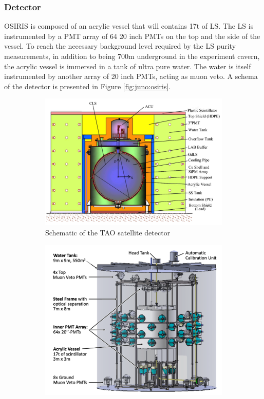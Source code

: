 \documentclass[../main.tex]{subfiles}
\begin{document}
\subsubsection{Detector}
OSIRIS is composed of an acrylic vessel that will contains 17t of LS. The LS is instrumented by a PMT array of 64 20 inch PMTs on the top and the side of the vessel. To reach the necessary background level required by the LS purity measurements, in addition to being 700m underground in the experiment cavern, the acrylic vessel is immersed in a tank of ultra pure water. The water is itself instrumented by another array of 20 inch PMTs, acting as muon veto. A schema of the detector is presented in Figure \ref{fig:juno:osiris}.

\begin{figure}[ht]
  \centering
  \begin{subfigure}[t]{0.49\linewidth}
    \includegraphics[width=\linewidth]{images/juno/tao_schematic.png}
    \caption{Schematic of the TAO satellite detector}
    \label{fig:juno:tao}
  \end{subfigure}
  \hfill
  \begin{subfigure}[t]{0.49\linewidth}
    \includegraphics[width=\linewidth]{images/juno/osiris_schematic.png}

\end{subfigure}
\end{figure}
\end{document}
